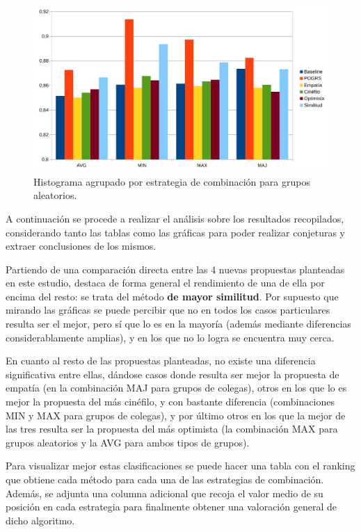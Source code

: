 \begin{figure}[H]
	\centering
	\includegraphics[scale=0.6]{imagenes/grafica-aleatorios.pdf}
	\caption{Histograma agrupado por estrategia de combinación para grupos aleatorios.}
	\label{grafica-aleatorios}
\end{figure}

A continuación se procede a realizar el análisis sobre los resultados recopilados, considerando tanto las tablas como las gráficas para poder realizar conjeturas y extraer conclusiones de los mismos.

Partiendo de una comparación directa entre las 4 nuevas propuestas planteadas en este estudio, destaca de forma general el rendimiento de una de ella por encima del resto: se trata del método \textbf{de mayor similitud}. Por supuesto que mirando las gráficas se puede percibir que no en todos los casos particulares resulta ser el mejor, pero sí que lo es en la mayoría (además mediante diferencias considerablamente amplias), y en los que no lo logra se encuentra muy cerca.

En cuanto al resto de las propuestas planteadas, no existe una diferencia significativa entre ellas, dándose casos donde resulta ser mejor la propuesta de empatía (en la combinación MAJ para grupos de colegas), otros en los que lo es mejor la propuesta del más cinéfilo, y con bastante diferencia (combinaciones MIN y MAX para grupos de colegas), y por último otros en los que la mejor de las tres resulta ser la propuesta del más optimista (la combinación MAX para grupos aleatorios y la AVG para ambos tipos de grupos).

Para visualizar mejor estas clasificaciones se puede hacer una tabla con el ranking que obtiene cada método para cada una de las estrategias de combinación. Además, se adjunta una columna adicional que recoja el valor medio de su posición en cada estrategia para finalmente obtener una valoración general de dicho algoritmo.

